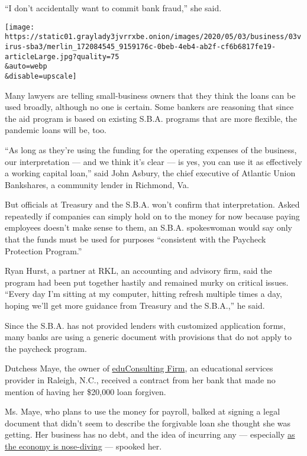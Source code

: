 ``I don't accidentally want to commit bank fraud,'' she said.

\texttt{[image: https://static01.graylady3jvrrxbe.onion/images/2020/05/03/business/03virus-sba3/merlin\_172084545\_9159176c-0beb-4eb4-ab2f-cf6b6817fe19-articleLarge.jpg?quality=75\\\&auto=webp\\\&disable=upscale]}

Many lawyers are telling small-business owners that they think the loans
can be used broadly, although no one is certain. Some bankers are
reasoning that since the aid program is based on existing S.B.A.
programs that are more flexible, the pandemic loans will be, too.

``As long as they're using the funding for the operating expenses of the
business, our interpretation --- and we think it's clear --- is yes, you
can use it as effectively a working capital loan,'' said John Asbury,
the chief executive of Atlantic Union Bankshares, a community lender in
Richmond, Va.

But officials at Treasury and the S.B.A. won't confirm that
interpretation. Asked repeatedly if companies can simply hold on to the
money for now because paying employees doesn't make sense to them, an
S.B.A. spokeswoman would say only that the funds must be used for
purposes ``consistent with the Paycheck Protection Program.''

Ryan Hurst, a partner at RKL, an accounting and advisory firm, said the
program had been put together hastily and remained murky on critical
issues. ``Every day I'm sitting at my computer, hitting refresh multiple
times a day, hoping we'll get more guidance from Treasury and the
S.B.A.,'' he said.

Since the S.B.A. has not provided lenders with customized application
forms, many banks are using a generic document with provisions that do
not apply to the paycheck program.

Dutchess Maye, the owner of
\href{https://www.educonsultingfirm.com/}{eduConsulting Firm}, an
educational services provider in Raleigh, N.C., received a contract from
her bank that made no mention of having her \$20,000 loan forgiven.

Ms. Maye, who plans to use the money for payroll, balked at signing a
legal document that didn't seem to describe the forgivable loan she
thought she was getting. Her business has no debt, and the idea of
incurring any --- especially
\href{https://www.nytimes3xbfgragh.onion/2020/04/29/business/economy/us-gdp.html}{as
the economy is nose-diving} --- spooked her.

